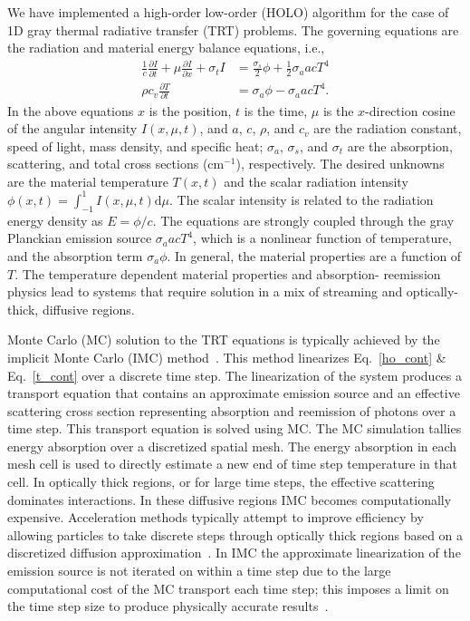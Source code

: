 \documentclass{mc2013}
\newcommand{\pderiv}[2]{\frac{\partial #1}{\partial #2}}
\renewcommand{\d}{\mathrm{d}}
\begin{document}
We have implemented a high-order low-order (HOLO) algorithm for the case of 1D gray thermal radiative transfer (TRT) problems. The governing equations are the radiation and
material energy balance equations, i.e.,\vspace{-0.05in}
\begin{align}\label{ho_cont}
    \frac{1}{c}\pderiv{I}{t} + \mu \pderiv{I}{x} + \sigma_t I
&= \frac{\sigma_s}{2} \phi +\frac{1}{2} \sigma_a a c T^4
    \\ \label{t_cont}
  \rho c_v \pderiv{T}{t} &=  \sigma_a \phi - \sigma_a a c T^4.
\end{align}
In the above equations $x$ is the position, $t$ is the time, $\mu$ is
the $x$-direction cosine of the angular intensity $I(x,\mu,t)$, and $a$, $c$, $\rho$,
and
$c_v$ are the radiation constant, speed of light, mass density, and specific heat; $\sigma_a$, $\sigma_s$, and
$\sigma_t$ are the absorption, scattering, and total
cross sections (cm$^{-1}$), respectively. The desired unknowns are the material
temperature $T(x,t)$ and the scalar radiation intensity $\phi(x,t)=\int_{-1}^1
I(x,\mu,t) \d \mu$.  The scalar intensity is related to the radiation energy density
as $E = \phi/c$.  The equations are
strongly coupled through the gray Planckian emission source $\sigma_a a c T^4$, which
is a nonlinear function of temperature, and the absorption
term $\sigma_a \phi$.   In general, the material properties are a function of $T$.  The temperature dependent material properties and
absorption- reemission physics lead to systems that require solution in a mix of
streaming and optically-thick, diffusive regions. 

Monte Carlo (MC) solution to the TRT equations is typically achieved by the 
implicit Monte Carlo (IMC) method~\cite{fnc}. This
method linearizes Eq.~\eqref{ho_cont} \& Eq.~\eqref{t_cont} over a discrete time
step.  The linearization of the system produces a transport equation that contains an approximate emission source and an effective scattering cross section representing
absorption and reemission of photons over a time step. This transport equation is solved using MC. The MC simulation tallies energy absorption
over a discretized spatial mesh.  The energy absorption in each mesh cell is used to directly estimate
a new end of time step temperature in that cell.  In optically thick regions, or for
large time steps, the
effective scattering dominates interactions.  In these diffusive regions IMC
becomes computationally expensive. Acceleration methods typically attempt to improve
efficiency by allowing particles to take discrete steps through optically thick
regions based on a discretized diffusion approximation~\cite{imd,ddmc}. 
In IMC the
approximate linearization of the emission source is not iterated on within a time
step due to the large computational cost of the MC transport each time step; this
imposes a limit on the time step size to produce physically accurate
results~\cite{wollaber2013discrete}. 
\end{document}
